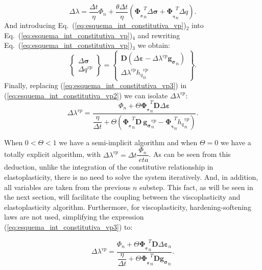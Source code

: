 \documentclass[Journal,letterpaper]{ascelike-new}
\newcommand{\Dsdee}{\boldsymbol{D}}
\newcommand{\hl}{{h_q}}
\newcommand{\dPhidsl}{\boldsymbol{\Phi_{_\sigma}}}
\newcommand{\dPhidql}{\boldsymbol{\Phi_{_q}}}
\newcommand{\dgds}{\boldsymbol{g_\sigma}}
\newcommand{\strain}{\boldsymbol{\varepsilon}}
\newcommand{\stress}{\boldsymbol{\sigma}}
\begin{document}
\begin{equation}
	\label{eq:esquema_int_constitutiva_vp2}
	\Delta \lambda = \dfrac{\Delta t}{\eta} \Phi_n + \dfrac{\theta \Delta t}{\eta}(\dPhidsl_n^T \Delta \stress + \dPhidql_n^T \Delta q).
\end{equation}
And introducing Eq.~(\ref{eq:esquema_int_constitutiva_vp})$_2$  into Eq.~(\ref{eq:esquema_int_constitutiva_vp})$_4$ and rewriting 
Eq.~(\ref{eq:esquema_int_constitutiva_vp})$_3$ we obtain:
\begin{equation}
	\label{eq:esquema_int_constitutiva_vp3}
	\left\{ \begin{array}{lcl} \Delta \stress \\ \Delta q^{vp} \end{array} \right\} = \left\{ \begin{array}{ccc} \Dsdee(\Delta\strain -\Delta \lambda^{vp} \dgds_n) \\ \Delta \lambda^{vp} \hl_n^{vp} \end{array} \right\}.
\end{equation}
Finally, replacing (\ref{eq:esquema_int_constitutiva_vp3}) in (\ref{eq:esquema_int_constitutiva_vp2}) we can isolate $\Delta \lambda^{vp}$:
\begin{equation}
	\label{eq:esquema_int_constitutiva_vp4}
	\Delta \lambda^{vp} = \dfrac{\Phi_n + \Theta \dPhidsl_n^T\Dsdee\Delta\strain}{\dfrac{\eta}{\Delta t} + \Theta (\dPhidsl_n^T\Dsdee~\dgds_n^{vp} - \dPhidql_n^T \hl_n^{vp})}.
\end{equation}

When $0 < \Theta < 1$ we have a semi-implicit algorithm and when $\Theta = 0$ we have a totally explicit algorithm, with $\Delta \lambda^{vp} = \Delta t \dfrac{\Phi_n}{\ eta}$. As can be seen from this deduction, unlike the integration of the constitutive relationship in elastoplasticity, there is no need to solve the system iteratively. And, in addition, all variables are taken from the previous $n$ substep. This fact, as will be seen in the next section, will facilitate the coupling between the viscoplasticity and elastoplasticity algorithm. Furthermore, for viscoplasticity, hardening-softening laws are not used, simplifying the expression (\ref{eq:esquema_int_constitutiva_vp3}) to:

\begin{equation}
	\label{eq:esquema_int_constitutiva_vp5}
	\Delta \lambda^{vp} = \dfrac{\Phi_n + \Theta \dPhidsl_n^T\Dsdee\Delta\strain_n}{\dfrac{\eta}{\Delta t} + \Theta \dPhidsl_n^T\Dsdee\dgds_n}.
\end{equation}
\end{document}
